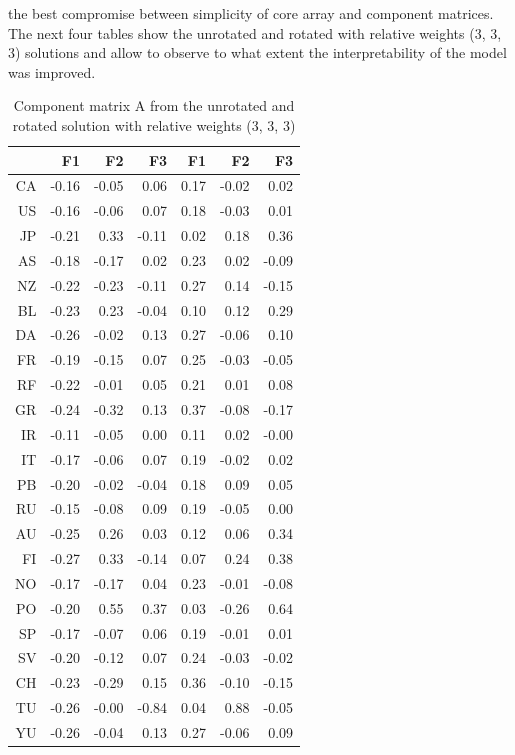 \documentclass[article,shortnames, nojss]{jss}
\begin{document}
the best compromise between simplicity of core array and component matrices.
The next four tables show the unrotated and rotated with relative weights
(3, 3, 3) solutions and allow to observe to what extent the
interpretability of the model was improved.
\begin{table}[H]
\centering
\begin{tabular}{rrrrrrr}
  \hline
 & F1 & F2 & F3 & F1 & F2 & F3 \\ 
  \hline
CA & -0.16 & -0.05 & 0.06 & 0.17 & -0.02 & 0.02 \\ 
  US & -0.16 & -0.06 & 0.07 & 0.18 & -0.03 & 0.01 \\ 
  JP & -0.21 & 0.33 & -0.11 & 0.02 & 0.18 & 0.36 \\ 
  AS & -0.18 & -0.17 & 0.02 & 0.23 & 0.02 & -0.09 \\ 
  NZ & -0.22 & -0.23 & -0.11 & 0.27 & 0.14 & -0.15 \\ 
  BL & -0.23 & 0.23 & -0.04 & 0.10 & 0.12 & 0.29 \\ 
  DA & -0.26 & -0.02 & 0.13 & 0.27 & -0.06 & 0.10 \\ 
  FR & -0.19 & -0.15 & 0.07 & 0.25 & -0.03 & -0.05 \\ 
  RF & -0.22 & -0.01 & 0.05 & 0.21 & 0.01 & 0.08 \\ 
  GR & -0.24 & -0.32 & 0.13 & 0.37 & -0.08 & -0.17 \\ 
  IR & -0.11 & -0.05 & 0.00 & 0.11 & 0.02 & -0.00 \\ 
  IT & -0.17 & -0.06 & 0.07 & 0.19 & -0.02 & 0.02 \\ 
  PB & -0.20 & -0.02 & -0.04 & 0.18 & 0.09 & 0.05 \\ 
  RU & -0.15 & -0.08 & 0.09 & 0.19 & -0.05 & 0.00 \\ 
  AU & -0.25 & 0.26 & 0.03 & 0.12 & 0.06 & 0.34 \\ 
  FI & -0.27 & 0.33 & -0.14 & 0.07 & 0.24 & 0.38 \\ 
  NO & -0.17 & -0.17 & 0.04 & 0.23 & -0.01 & -0.08 \\ 
  PO & -0.20 & 0.55 & 0.37 & 0.03 & -0.26 & 0.64 \\ 
  SP & -0.17 & -0.07 & 0.06 & 0.19 & -0.01 & 0.01 \\ 
  SV & -0.20 & -0.12 & 0.07 & 0.24 & -0.03 & -0.02 \\ 
  CH & -0.23 & -0.29 & 0.15 & 0.36 & -0.10 & -0.15 \\ 
  TU & -0.26 & -0.00 & -0.84 & 0.04 & 0.88 & -0.05 \\ 
  YU & -0.26 & -0.04 & 0.13 & 0.27 & -0.06 & 0.09 \\ 
   \hline
\end{tabular}
\caption{Component matrix A from the unrotated and
    rotated solution with relative weights (3, 3, 3)} 
\label{tab:varimax-A}
\end{table}
\end{document}

